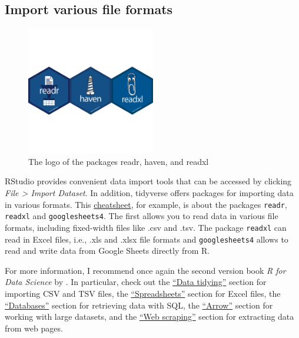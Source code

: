 \documentclass[
  12pt,
  oneside]{book}
\theoremstyle{definition}
\theoremstyle{definition}
\theoremstyle{definition}
\theoremstyle{definition}
\theoremstyle{remark}
\begin{document}
\hypertarget{import-various-file-formats}{%
\subsection{Import various file formats}\label{import-various-file-formats}}

\begin{figure}
\centering
\includegraphics[width=0.5\textwidth,height=\textheight]{fig/import-logo.png}
\caption{\label{fig:import-logo} The logo of the packages readr, haven, and readxl}
\end{figure}

RStudio provides convenient data import tools that can be accessed by clicking \emph{File \textgreater{} Import Dataset}. In addition, tidyverse offers packages for importing data in various formats. This \href{https://posit.co/wp-content/uploads/2022/10/data-import.pdf}{cheatsheet}, for example, is about the packages \texttt{readr}, \texttt{readxl} and \texttt{googlesheets4}. The first allows you to read data in various file formats, including fixed-width files like .csv and .tsv. The package \texttt{readxl} can read in Excel files, i.e., .xls and .xlsx file formats and \texttt{googlesheets4} allows to read and write data from Google Sheets directly from R.

For more information, I recommend once again the second version book \emph{R for Data Science} by \href{https://r4ds.hadley.nz/}{\citet{Wickham2023R}}. In particular, check out the \href{https://r4ds.hadley.nz/data-tidy.html}{``Data tidying''} section for importing CSV and TSV files, the \href{https://r4ds.hadley.nz/spreadsheets.html}{``Spreadsheets''} section for Excel files, the \href{https://r4ds.hadley.nz/databases.html}{``Databases''} section for retrieving data with SQL, the \href{https://r4ds.hadley.nz/arrow.html}{``Arrow''} section for working with large datasets, and the \href{https://r4ds.hadley.nz/webscraping.html}{``Web scraping''} section for extracting data from web pages.
\end{document}
